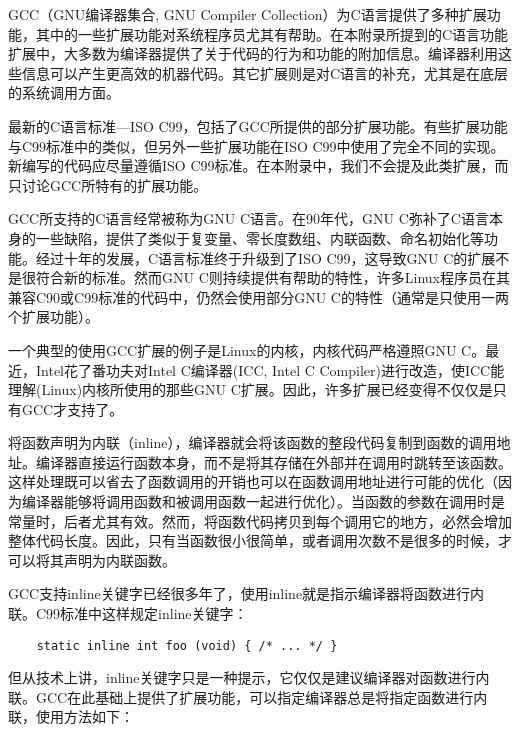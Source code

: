 
\appendix

GCC（GNU编译器集合, GNU Compiler Collection）为C语言提供了多种扩展功能，其中的一些扩展功能对系统程序员尤其有帮助。在本附录所提到的C语言功能扩展中，大多数为编译器提供了关于代码的行为和功能的附加信息。编译器利用这些信息可以产生更高效的机器代码。其它扩展则是对C语言的补充，尤其是在底层的系统调用方面。

最新的C语言标准---ISO C99，包括了GCC所提供的部分扩展功能。有些扩展功能与C99标准中的类似，但另外一些扩展功能在ISO C99中使用了完全不同的实现。新编写的代码应尽量遵循ISO C99标准。在本附录中，我们不会提及此类扩展，而只讨论GCC所特有的扩展功能。

GCC所支持的C语言经常被称为GNU C语言。在90年代，GNU C弥补了C语言本身的一些缺陷，提供了类似于复变量、零长度数组、内联函数、命名初始化等功能。经过十年的发展，C语言标准终于升级到了ISO C99，这导致GNU C的扩展不是很符合新的标准。然而GNU C则持续提供有帮助的特性，许多Linux程序员在其兼容C90或C99标准的代码中，仍然会使用部分GNU C的特性（通常是只使用一两个扩展功能）。

一个典型的使用GCC扩展的例子是Linux的内核，内核代码严格遵照GNU C。最近，Intel花了番功夫对Intel C编译器(ICC, Intel C Compiler)进行改造，使ICC能理解(Linux)内核所使用的那些GNU C扩展。因此，许多扩展已经变得不仅仅是只有GCC才支持了。

将函数声明为内联（inline），编译器就会将该函数的整段代码复制到函数的调用地址。编译器直接运行函数本身，而不是将其存储在外部并在调用时跳转至该函数。这样处理既可以省去了函数调用的开销也可以在函数调用地址进行可能的优化（因为编译器能够将调用函数和被调用函数一起进行优化）。当函数的参数在调用时是常量时，后者尤其有效。然而，将函数代码拷贝到每个调用它的地方，必然会增加整体代码长度。因此，只有当函数很小很简单，或者调用次数不是很多的时候，才可以将其声明为内联函数。

GCC支持inline关键字已经很多年了，使用inline就是指示编译器将函数进行内联。C99标准中这样规定inline关键字：
\begin{lstlisting}
	static inline int foo (void) { /* ... */ }
\end{lstlisting}
但从技术上讲，inline关键字只是一种提示，它仅仅是建议编译器对函数进行内联。GCC在此基础上提供了扩展功能，可以指定编译器总是将指定函数进行内联，使用方法如下：

